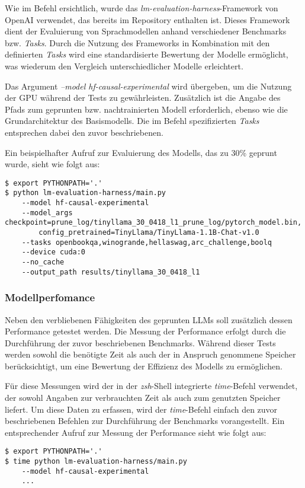 Wie im Befehl ersichtlich, wurde das \emph{lm-evaluation-harness}-Framework von
OpenAI verwendet, das bereits im Repository enthalten ist. Dieses Framework
dient der Evaluierung von Sprachmodellen anhand verschiedener Benchmarks bzw.
\emph{Tasks}. Durch die Nutzung des Frameworks in Kombination mit den
definierten \emph{Tasks} wird eine standardisierte Bewertung der Modelle
ermöglicht, was wiederum den Vergleich unterschiedlicher Modelle erleichtert.

Das Argument \emph{--model hf-causal-experimental} wird übergeben, um die
Nutzung der GPU während der Tests zu gewährleisten. Zusätzlich ist die Angabe
des Pfads zum geprunten bzw. nachtrainierten Modell erforderlich, ebenso wie die
Grundarchitektur des Basismodells. Die im Befehl spezifizierten \emph{Tasks}
entsprechen dabei den zuvor beschriebenen.

Ein beispielhafter Aufruf zur Evaluierung des Modells, das zu 30\% geprunt wurde,
sieht wie folgt aus:

\vspace{1em}
\begin{lstlisting}
$ export PYTHONPATH='.'
$ python lm-evaluation-harness/main.py
    --model hf-causal-experimental
    --model_args checkpoint=prune_log/tinyllama_30_0418_l1_prune_log/pytorch_model.bin,
        config_pretrained=TinyLlama/TinyLlama-1.1B-Chat-v1.0
    --tasks openbookqa,winogrande,hellaswag,arc_challenge,boolq
    --device cuda:0
    --no_cache
    --output_path results/tinyllama_30_0418_l1
\end{lstlisting}

\subsubsection{Modellperfomance}

Neben den verbliebenen Fähigkeiten des geprunten LLMs soll zusätzlich dessen
Performance getestet werden. Die Messung der Performance erfolgt durch die
Durchführung der zuvor beschriebenen Benchmarks. Während dieser Tests werden
sowohl die benötigte Zeit als auch der in Anspruch genommene Speicher
berücksichtigt, um eine Bewertung der Effizienz des Modells zu ermöglichen.

Für diese Messungen wird der in der \emph{zsh}-Shell integrierte
\emph{time}-Befehl verwendet, der sowohl Angaben zur verbrauchten Zeit als auch
zum genutzten Speicher liefert. Um diese Daten zu erfassen, wird der
\emph{time}-Befehl einfach den zuvor beschriebenen Befehlen zur Durchführung der
Benchmarks vorangestellt. Ein entsprechender Aufruf zur Messung der Performance
sieht wie folgt aus:

\vspace{1em}
\begin{lstlisting}
$ export PYTHONPATH='.'
$ time python lm-evaluation-harness/main.py
    --model hf-causal-experimental
    ...
\end{lstlisting}

\newpage
